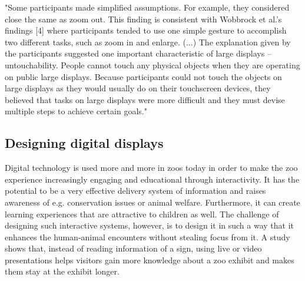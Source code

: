 "Some participants made simplified assumptions. For example, they
considered close the same as zoom out. This finding is consistent with Wobbrock
et al.’s findings [4] where participants tended to use one simple gesture to accomplish
two different tasks, such as zoom in and enlarge. (...) The explanation given by the participants suggested one important characteristic
of large displays – untouchability. People cannot touch any physical objects
when they are operating on public large displays. Because participants could not touch the objects on large displays as they would usually do on their touchscreen devices, they believed that tasks on large displays were more difficult and they must devise  multiple steps to achieve certain goals."


\subsection{Designing digital displays}
Digital technology is used more and more in zoos today in order to make the zoo experience increasingly engaging and educational through interactivity\cite{webberInteractiveTechInZoo}. It has the potential to be a very effective delivery system of information and raises awareness of e.g. conservation issues or animal welfare. Furthermore, it can create learning experiences that are attractive to children as well\cite{webberInteractiveTechInZoo}. The challenge of designing such interactive systems, however, is to design it in such a way that it enhances the human-animal encounters without stealing focus from it\cite{webberInteractiveTechInZoo}. A study shows that, instead of reading information of a sign, using live or video presentations helps visitors gain more knowledge about a zoo exhibit and makes them stay at the exhibit longer\cite{presentationStayDuration}.

